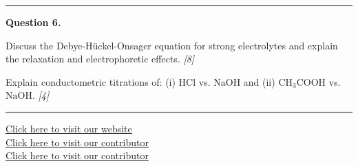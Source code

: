\documentclass[11pt,a4paper]{article}
\newcommand{\pts}[1]{\hfill   \textit{[#1]}}
\begin{document}
\medskip\rule{\linewidth}{0.2pt}




\noindent   \textbf{Question 6.}

\begin{parts}
  \item Discuss the Debye-H\"uckel-Onsager equation for strong electrolytes and explain the relaxation and electrophoretic effects. \pts{8}
  \item Explain conductometric titrations of: (i) $ \text{HCl}$ vs. $ \text{NaOH}$ and (ii) $ \text{CH}_3 \text{COOH}$ vs. $ \text{NaOH}$. \pts{4}
\end{parts}

\vfill
\rule{\linewidth}{0.4pt}

\begin{center}\small
  \href{https://bhu-exam.vercel.app/}{Click here to visit our website}\\[4pt]
  \href{https://me-aryan.vercel.app/}{Click here to visit our contributor}\\[4pt]
  \href{https://quashan-me.vercel.app/}{Click here to visit our contributor}
\end{center}
\end{document}
